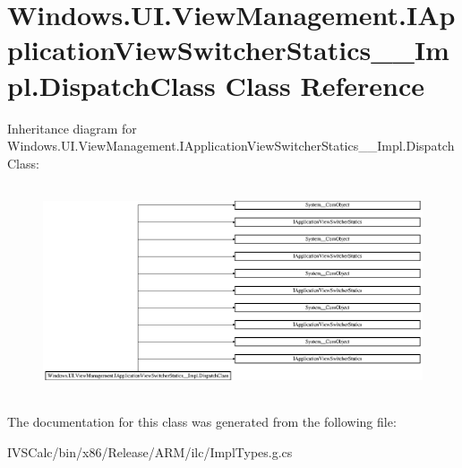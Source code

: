 \hypertarget{class_windows_1_1_u_i_1_1_view_management_1_1_i_application_view_switcher_statics_____impl_1_1_dispatch_class}{}\section{Windows.\+U\+I.\+View\+Management.\+I\+Application\+View\+Switcher\+Statics\+\_\+\+\_\+\+Impl.\+Dispatch\+Class Class Reference}
\label{class_windows_1_1_u_i_1_1_view_management_1_1_i_application_view_switcher_statics_____impl_1_1_dispatch_class}
Inheritance diagram for Windows.\+U\+I.\+View\+Management.\+I\+Application\+View\+Switcher\+Statics\+\_\+\+\_\+\+Impl.\+Dispatch\+Class\+:\begin{figure}[H]
\begin{center}
\leavevmode
\includegraphics[height=6.247465cm]{class_windows_1_1_u_i_1_1_view_management_1_1_i_application_view_switcher_statics_____impl_1_1_dispatch_class}
\end{center}
\end{figure}


The documentation for this class was generated from the following file\+:\begin{DoxyCompactItemize}
\item 
I\+V\+S\+Calc/bin/x86/\+Release/\+A\+R\+M/ilc/Impl\+Types.\+g.\+cs\end{DoxyCompactItemize}

